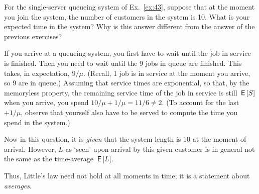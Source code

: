 \begin{exercise}[\faBalanceScale]\label{ex:44}
  For the single-server queueing system of Ex.~\ref{ex:43}, suppose that at the moment you join the system, the number of customers in the system is 10.
  What is your expected time in the system?
  Why is this answer different from the answer of the previous exercises?
    \begin{solution}
If you arrive at a queueing system, you first have to wait until the job in service is finished.  Then you need to wait until the 9 jobs in queue are finished. This takes, in expectation, $9/\mu$. (Recall, 1 job is in service at the moment you arrive, so 9 are in queue.) Assuming that service times are exponential, so that, by the memoryless property, the remaining service time of the job in service is still $\,\mathsf{E}\left[S\right]$ when you arrive, you spend $10/\mu + 1/\mu = 11/6 \neq 2$. (To account for the last $+1/\mu$, observe that yourself also have to be served to compute the time you spend in the system.)


Now  in this question, it is \emph{given} that the system
    length is 10 at the moment of arrival. However, $L$ as `seen' upon arrival by this
    given customer  is in general  not the same as the  time-average $\,\mathsf{E}\left[L\right]$.

Thus, Little's law need  not hold at all moments in time; it is a statement about \emph{averages}.
    \end{solution}

\end{exercise}







